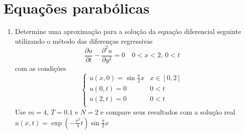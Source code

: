 \documentclass[a4paper, 11pt]{report}
\begin{document}
\section{Equações parabólicas}
\begin{enumerate}[leftmargin=*]
    \item Determine uma aproximação para a solução da equação diferencial seguinte utilizando o método das diferenças regressivas
    \[
        \dfrac{\partial u}{\partial t} - \dfrac{\partial^2 u}{\partial y^2} = 0 \quad 0 < x < 2, \, 0 < t
        \]
        com as condições
        \[
            \left\{  
                \begin{array}{ll}
                    u(x,0) = \sin \frac{\pi}{2} x & x \in [0,2]\\  
                    u(0,t) = 0 & 0 < t\\
                    u(2,t) = 0 & 0 < t\\
                \end{array}
            \right.
        \]
        Use $m = 4$, $T = 0.1$ e $N = 2$ e compare seus resultados com a solução real $u(x,t) = \exp\left(-\frac{\pi^2}{4}t\right)\sin \frac{\pi}{2}x$
        

\end{enumerate}
\end{document}
